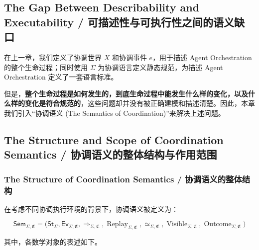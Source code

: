 \subsection{The Gap Between Describability and Executability /
可描述性与可执行性之间的语义缺口}

在上一章，我们定义了协调世界 $X$ 和协调事件 $e$，用于描述 Agent Orchestration 的整个生命过程；同时使用 $\Sigma$ 为协调语言定义静态规范，为描述 Agent Orchestration 定义了一套语言标准。

但是，\textbf{整个生命过程是如何发生的，到底生命过程中能发生什么样的变化，以及什么样的变化是符合规范的}，这些问题却并没有被正确建模和描述清楚。因此，本章我们引入“协调语义 (The Semantics of Coordination)”来解决上述问题。

\subsection{The Structure and Scope of Coordination Semantics /
协调语义的整体结构与作用范围}

\subsubsection{The Structure of Coordination Semantics / 协调语义的整体结构}

在考虑不同协调执行环境的背景下，协调语义被定义为：

\begin{equation}
  \boxed{
    \mathsf{Sem}_{\Sigma,\mathfrak E}
    =
    \bigl(
      \mathsf{St}_{\Sigma},
      \mathsf{Ev}_{\Sigma,\mathfrak E},
      \Rightarrow_{\Sigma,\mathfrak E},
      \operatorname{Replay}_{\Sigma,\mathfrak E},
      \simeq_{\Sigma,\mathfrak E},
      \operatorname{Visible}_{\Sigma,\mathfrak E},
      \operatorname{Outcome}_{\Sigma,\mathfrak E}
    \bigr)
  }\label{eq:coordination-semantics-structure}
\end{equation}

其中，各数学对象的表述如下。

